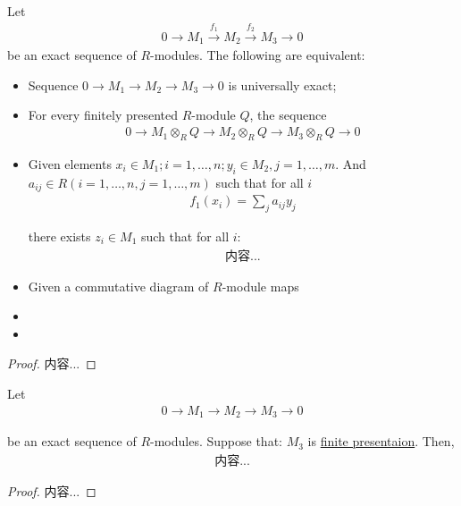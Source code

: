 \documentclass[Total.tex]{subfiles}
\begin{document}
				\begin{theorem}
					Let 
					\begin{gather*}
						0\rightarrow M_1\stackrel{f_1}{\rightarrow} M_2 \stackrel{f_2}{\rightarrow} M_3\rightarrow0
					\end{gather*}
					be an exact sequence of $R$-modules. The following are equivalent:
					\begin{itemize}
						\item Sequence $0\rightarrow M_1\rightarrow M_2\rightarrow M_3\rightarrow 0$ is universally exact;
						\item For every finitely presented $R$-module $Q$, the sequence
						\begin{gather*}
							0\rightarrow M_1\otimes_R Q\rightarrow M_2\otimes_R Q\rightarrow M_3\otimes_R Q\rightarrow 0
						\end{gather*}
						\item Given elements $x_i\in M_1;i=1,\dots,n;y_i\in M_2,j=1,\dots,m$. And $a_{ij}\in R(i=1,\dots,n,j=1,\dots,m)$ such that for all $i$
						\begin{gather*}
							f_1(x_i)=\sum_{j} a_{ij}y_j
						\end{gather*}
						
						there exists $z_i\in M_1$ such that for all $i$:
						\begin{gather*}
							内容...
						\end{gather*}
						\item Given a commutative diagram of $R$-module maps
						\begin{center}
						\end{center}
						\item 
						\item 
					\end{itemize}
				\end{theorem}
				\begin{proof}
					内容...
				\end{proof}
				
				\begin{lemma}
					Let
					\begin{gather*}
						0\rightarrow M_1\rightarrow M_2\rightarrow M_3\rightarrow 0
					\end{gather*}
					
					be an exact sequence of $R$-modules. Suppose that: $M_3$ is \underline{finite presentaion}. Then, 
					\begin{gather*}
						内容...
					\end{gather*}
				\end{lemma}
				\begin{proof}
					内容...
				\end{proof}
\end{document}
